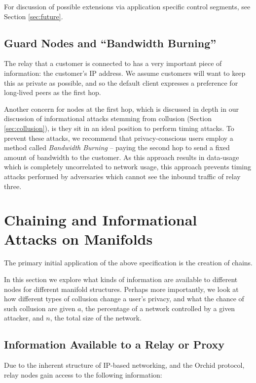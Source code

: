 \documentclass{article}
\newcommand{\mesh}{Orchid}
\begin{document}
For discussion of possible extensions via application specific control
segments, see Section \ref{sec:future}.

\subsection{Guard Nodes and ``Bandwidth Burning''}

The relay that a customer is connected to has a very important piece
of information: the customer’s IP address. We assume customers will
want to keep this as private as possible, and so the default client
expresses a preference for long-lived peers as the first
hop.

Another concern for nodes at the first hop, which is discussed in
depth in our discussion of informational attacks stemming from
collusion (Section \ref{sec:collusion}), is they sit in an ideal
position to perform timing attacks. To prevent these attacks, we
recommend that privacy-conscious users employ a method called
\emph{Bandwidth Burning} -- paying the second hop to send a fixed
amount of bandwidth to the customer. As this approach results in
data-usage which is completely uncorrelated to network usage, this
approach prevents timing attacks performed by adversaries which cannot
see the inbound traffic of relay three.

\section{Chaining and Informational Attacks on Manifolds}

The primary initial application of the above specification is the
creation of chains.

In this section we explore what kinds of information are available to different nodes for different manifold structures. Perhaps more importantly, we look at how different types of collusion change a user's privacy, and what the chance of such collusion are given $a$, the percentage of a network controlled by a given attacker, and $n$, the total size of the network.

\subsection{Information Available to a Relay or Proxy}
\label{relay-proxy-info-known}

Due to the inherent structure of IP-based networking, and the \mesh{} protocol, relay nodes gain access to the following information:
\end{document}
